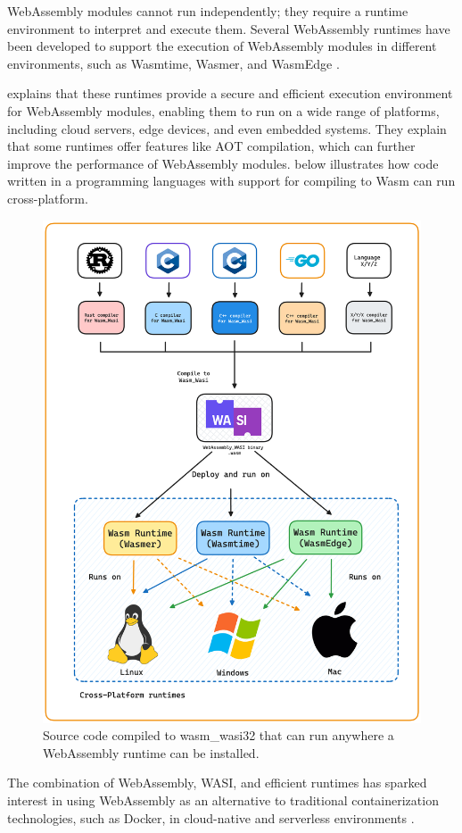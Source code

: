 \documentclass[
  table]{report}
\begin{document}
WebAssembly modules cannot run independently; they require a runtime
environment to interpret and execute them. Several WebAssembly runtimes
have been developed to support the execution of WebAssembly modules in
different environments, such as Wasmtime, Wasmer, and WasmEdge
\citep{zhang2024}.

\citet{zhang2024} explains that these runtimes provide a secure and
efficient execution environment for WebAssembly modules, enabling them
to run on a wide range of platforms, including cloud servers, edge
devices, and even embedded systems. They explain that some runtimes
offer features like \ac{AOT} compilation, which can further improve the
performance of WebAssembly modules.  below
illustrates how code written in a programming languages with support for
compiling to \ac{Wasm} can run cross-platform.

\begin{figure}[H]
\centering
  \includegraphics[width=0.7\columnwidth]{assets/3-wasm-runtime.png}
  \caption{Source code compiled to wasm\_wasi32 that can run anywhere
a WebAssembly runtime can be installed.}
  \label{fig:wasm-runtimes}
\end{figure}

The combination of WebAssembly, WASI, and efficient runtimes has sparked
interest in using WebAssembly as an alternative to traditional
containerization technologies, such as Docker, in cloud-native and
serverless environments \citep{shillakerFaasmLightweightIsolation2020a,
sebrechtsAdaptingKubernetesControllers2022}.
\end{document}
